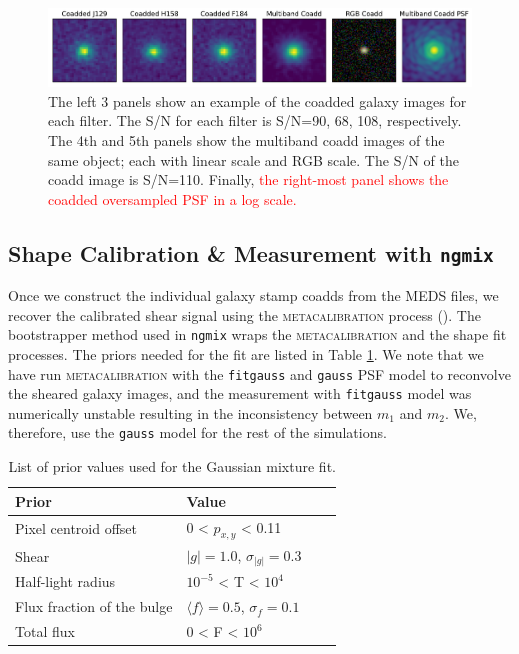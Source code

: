 \documentclass[fleqn,usenatbib]{mnras}
\begin{document}
\begin{figure}
	\includegraphics[width=\textwidth]{coadd_galaxy_example_log.pdf}
    \caption{The left 3 panels show an example of the coadded galaxy images for each filter. The S/N for each filter is S/N=90, 68, 108, respectively. The 4th and 5th panels show the multiband coadd images of the same object; each with linear scale and RGB scale. The S/N of the coadd image is S/N=110. Finally, \textcolor{red}{the right-most panel shows the coadded oversampled PSF in a log scale.}}
    \label{fig:single_to_coadd_rgb}
\end{figure}

\par

\subsection{Shape Calibration \& Measurement with \texttt{ngmix}}
\label{subsec:mcal}
Once we construct the individual galaxy stamp coadds from the MEDS files, we recover the calibrated shear signal using the \textsc{metacalibration} process (\citealt{2017arXiv170202600H, 2017ApJ...841...24S}). The bootstrapper method used in \texttt{ngmix} wraps the \textsc{metacalibration} and the shape fit processes. The priors needed for the fit are listed in Table \ref{tab:priors}. We note that we have run \textsc{metacalibration} with the \texttt{fitgauss} and \texttt{gauss} PSF model to reconvolve the sheared galaxy images, and the measurement with \texttt{fitgauss} model was numerically unstable resulting in the inconsistency between $m_{1}$ and $m_{2}$. We, therefore, use the \texttt{gauss} model for the rest of the simulations. 

\begin{table}
    \centering
    \begin{tabular}{|p{3cm}||p{3cm}|p{3cm}|p{3cm}|}
    \hline
    Prior & Value \\
    \hline
    Pixel centroid offset & 0 < $p_{x,y}$ < 0.11\\
    Shear & $|g|=1.0$, $\sigma_{|g|} = 0.3$\\
    Half-light radius & $10^{-5}$ < T < $10^{4}$\\
    Flux fraction of the bulge  & $\langle f\rangle = 0.5$, $\sigma_{f} = 0.1$\\
    Total flux & $0$ < F < $10^{6}$\\
    \hline
    \end{tabular}
    \caption{List of prior values used for the Gaussian mixture fit.}
    \label{tab:priors}
\end{table}
\end{document}
